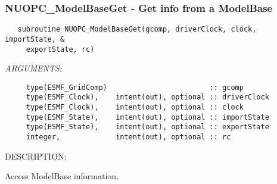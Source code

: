  
\setlength{\oldparskip}{\parskip}
\setlength{\parskip}{1.5ex}
\setlength{\oldparindent}{\parindent}
\setlength{\parindent}{0pt}
\setlength{\oldbaselineskip}{\baselineskip}
\setlength{\baselineskip}{11pt}
 
\def\bv{\begin{verbatim}}
\def\ev{\end{verbatim}}
\def\be{\begin{equation}}
\def\ee{\end{equation}}
\def\bea{\begin{eqnarray}}
\def\eea{\end{eqnarray}}
\def\bi{\begin{itemize}}
\def\ei{\end{itemize}}
\def\bn{\begin{enumerate}}
\def\en{\end{enumerate}}
\def\bd{\begin{description}}
\def\ed{\end{description}}
\def\({\left (}
\def\){\right )}
\def\[{\left [}
\def\]{\right ]}
\def\<{\left  \langle}
\def\>{\right \rangle}
\def\cI{{\cal I}}
\def\diag{\mathop{\rm diag}}
\def\tr{\mathop{\rm tr}}


 
\subsubsection [NUOPC\_ModelBaseGet] {NUOPC\_ModelBaseGet - Get info from a ModelBase}


  
\begin{verbatim}   subroutine NUOPC_ModelBaseGet(gcomp, driverClock, clock, importState, &
     exportState, rc)\end{verbatim}{\em ARGUMENTS:}
\begin{verbatim}     type(ESMF_GridComp)                        :: gcomp
     type(ESMF_Clock),    intent(out), optional :: driverClock
     type(ESMF_Clock),    intent(out), optional :: clock
     type(ESMF_State),    intent(out), optional :: importState
     type(ESMF_State),    intent(out), optional :: exportState
     integer,             intent(out), optional :: rc\end{verbatim}
{\sf DESCRIPTION:\\ }


     Access ModelBase information.
\setlength{\parskip}{\oldparskip}
\setlength{\parindent}{\oldparindent}
\setlength{\baselineskip}{\oldbaselineskip}

